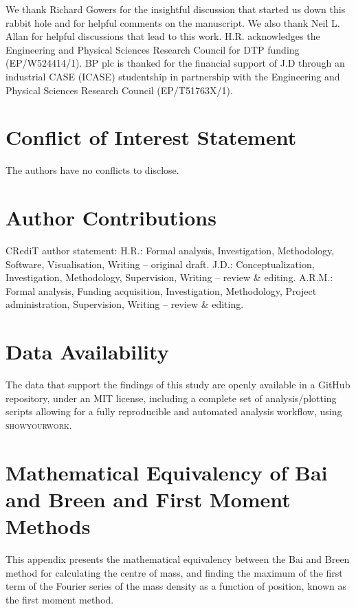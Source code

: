 \documentclass[reprint,superscriptaddress,nobibnotes,amsmath,amssymb,aip]{revtex4-2}
\begin{document}
\begin{acknowledgements}
We thank Richard Gowers for the insightful discussion that started us down this rabbit hole and for helpful comments on the manuscript.
We also thank Neil L. Allan for helpful discussions that lead to this work. 
H.R. acknowledges the Engineering and Physical Sciences Research Council for DTP funding (EP/W524414/1). 
BP plc is thanked for the financial support of J.D
through an industrial CASE (ICASE) studentship in partnership
with the Engineering and Physical Sciences Research Council (EP/T51763X/1).
\end{acknowledgements}

\section*{Conflict of Interest Statement}

The authors have no conflicts to disclose.

\section*{Author Contributions}
CRediT author statement: 
H.R.: Formal analysis, Investigation, Methodology, Software, Visualisation, Writing – original draft.
J.D.: Conceptualization, Investigation, Methodology, Supervision, Writing – review \& editing.
A.R.M.: Formal analysis, Funding acquisition, Investigation, Methodology, Project administration, Supervision, Writing – review \& editing.

\section*{Data Availability}

The data that support the findings of this study are openly available in a GitHub repository\cite{richardson_github_2025}, under an MIT license, including a complete set of analysis/plotting scripts allowing for a fully reproducible and automated analysis workflow, using \textsc{showyourwork}\cite{luger_showyourwork_2021}.

\appendix

\section{Mathematical Equivalency of Bai and Breen and First Moment Methods}
\label{app:math}

This appendix presents the mathematical equivalency between the Bai and Breen method for calculating the centre of mass, and finding the maximum of the first term of the Fourier series of the mass density as a function of position, known as the first moment method.\cite{teague_robust_2018}
\end{document}
